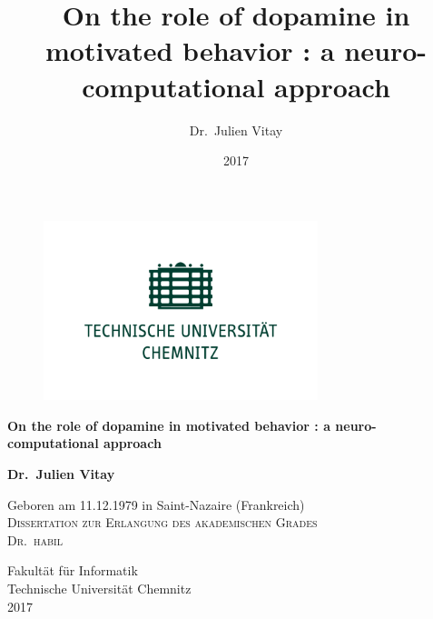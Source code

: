 \documentclass[
  11pt,
  a4paper,
]{scrbook}
\title{On the role of dopamine in motivated behavior : a
neuro-computational approach}
\author{Dr.~Julien Vitay}
\date{2017}
\begin{document}
    \frontmatter


    \cleardoublepage
    \thispagestyle{empty}

    {\centering

        \begin{figure}[h!]
            \begin{center}
                \includegraphics[width=8cm]{img/tuc.png}
            \end{center}
        \end{figure}
        
        \vfill

        {\Huge\bfseries On the role of dopamine in motivated behavior :
a neuro-computational approach\\[5pt] } %
        
        
        \vspace{1.5cm}

                    {\LARGE\bfseries Dr.~Julien Vitay}\\[5pt]
        
        \vspace{1cm}

        
                { Geboren am 11.12.1979 in Saint-Nazaire
(Frankreich)} \\[5pt]
        
                    \vspace{1cm}
                        \textsc{Dissertation zur Erlangung des
akademischen Grades} \\[1cm]
                        \textsc{\Large{{Dr.~habil}}} \\[5pt] %
                
        \vfill

                            {Fakultät für
Informatik}\\[5pt] %
                            {Technische Universität
Chemnitz}\\[5pt] %
        
        \vfill
                    {2017} %
        
        
    }
\end{document}
